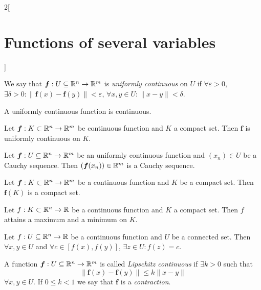 \documentclass[../../../main.tex]{subfiles}
\begin{document}
\begin{multicols}{2}[\section{Functions of several variables}]
\begin{definition}
    \end{definition}
    \begin{definition}
        We say that $\mathbf{\boldsymbol{f}}:U\subseteq\mathbb{R}^n\rightarrow\mathbb{R}^m$ is \textit{uniformly continuous} on $U$ if $\forall\varepsilon>0$, $\exists\delta>0:\|\mathbf{\boldsymbol{f}}(x)-\mathbf{\boldsymbol{f}}(y)\|<\varepsilon$, $\forall x,y\in U:\|x-y\|<\delta$.
    \end{definition}
    \begin{corollary}
        A uniformly continuous function is continuous.
    \end{corollary}
    \begin{theorem}
        Let $\mathbf{\boldsymbol{f}}:K\subset\mathbb{R}^n\rightarrow\mathbb{R}^m$ be continuous function and $K$ a compact set. Then $\mathbf{\boldsymbol{f}}$ is uniformly continuous on $K$.
    \end{theorem}
    \begin{theorem}
        Let $\mathbf{\boldsymbol{f}}:U\subseteq\mathbb{R}^n\rightarrow\mathbb{R}^m$ be an uniformly continuous function and $(x_n)\in U$ be a Cauchy sequence. Then $(\mathbf{\boldsymbol{f}}(x_n))\in\mathbb{R}^m$ is a Cauchy sequence.
    \end{theorem}
    \begin{theorem}
        Let $\mathbf{\boldsymbol{f}}:K\subset\mathbb{R}^n\rightarrow\mathbb{R}^m$ be a continuous function and $K$ be a compact set. Then $\mathbf{\boldsymbol{f}}(K)$ is a compact set.
    \end{theorem}
    \begin{theorem}
        Let $f:K\subset\mathbb{R}^n\rightarrow\mathbb{R} $ be a continuous function and $K$ a compact set. Then $f$ attains a maximum and a minimum on $K$.
    \end{theorem}
    \begin{theorem}
        Let $f:U\subseteq\mathbb{R}^n\rightarrow\mathbb{R} $ be a continuous function and $U$ be a connected set. Then $\forall x,y\in U$ and $\forall c\in[f(x),f(y)]$, $\exists z\in U:f(z)=c$.
    \end{theorem}
    \begin{definition}
        A function $\mathbf{\boldsymbol{f}}:U\subseteq\mathbb{R}^n\rightarrow\mathbb{R}^m$ is called \textit{Lipschitz continuous} if $\exists k>0$ such that $$\|\mathbf{\boldsymbol{f}}(x)-\mathbf{\boldsymbol{f}}(y)\|\leq k\|x-y\|$$ $\forall x,y\in U$. If $0\leq k<1$ we say that $\mathbf{\boldsymbol{f}}$ is a \textit{contraction}.
        \label{FOSV_contr}
    \end{definition}

\end{multicols}
\end{document}
